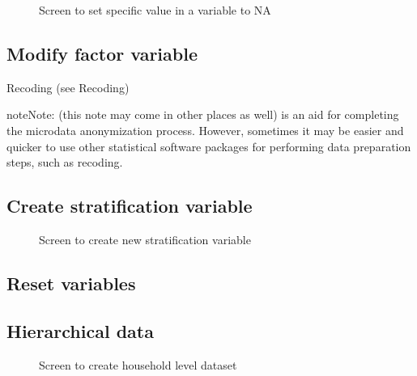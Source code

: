 \documentclass[letterpaper,10pt,english]{sphinxmanual}
\begin{document}
\begin{figure}[htbp]
\centering
\capstart

\noindent{}
\caption{Screen to set specific value in a variable to NA}\label{\detokenize{loadprepdata:fig57}}\label{\detokenize{loadprepdata:id7}}\end{figure}


\subsection{Modify factor variable}
\label{\detokenize{loadprepdata:modify-factor-variable}}
Recoding (see Recoding)

\begin{sphinxadmonition}{note}{Note:}
(this note may come in other places as well)  is an aid for completing the
microdata anonymization process. However, sometimes it may be easier and quicker to
use other statistical software packages for performing data preparation steps, such as
recoding.
\end{sphinxadmonition}


\subsection{Create stratification variable}
\label{\detokenize{loadprepdata:create-stratification-variable}}
\begin{figure}[htbp]
\centering
\capstart

\noindent{}
\caption{Screen to create new stratification variable}\label{\detokenize{loadprepdata:fig58}}\label{\detokenize{loadprepdata:id8}}\end{figure}


\subsection{Reset variables}
\label{\detokenize{loadprepdata:reset-variables}}

\subsection{Hierarchical data}
\label{\detokenize{loadprepdata:hierarchical-data}}
\begin{figure}[htbp]
\centering
\capstart

\noindent{}
\caption{Screen to create household level dataset}\label{\detokenize{loadprepdata:fig59}}\label{\detokenize{loadprepdata:id9}}\end{figure}
\end{document}
